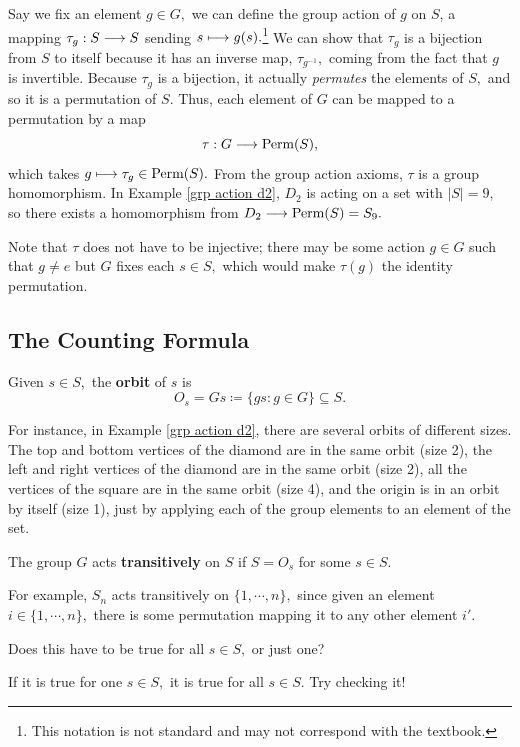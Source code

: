 Say we fix an element $g \in G,$ we can define the group action of $g$ on $S$, a mapping $\tau_g: S \longrightarrow S$ sending $s \longmapsto g(s).$\footnote{This notation is not standard and may not correspond with the textbook.} We can show that $\tau_g$ is a bijection from $S$ to itself because it has an inverse map, $\tau_{g^{-1}},$ coming from the fact that $g$ is invertible. Because $\tau_g$ is a bijection, it actually \emph{permutes} the elements of $S,$ and so it is a permutation of $S.$ Thus, each element of $G$ can be mapped to a permutation by a map
\[
\tau: G \longrightarrow \text{Perm}(S),
\]
which takes $g \longmapsto \tau_g \in \text{Perm}(S).$ From the group action axioms, $\tau$ is a group homomorphism. In Example \ref{grp action d2}, $D_2$ is acting on a set with $|S| = 9,$ so there exists a homomorphism from $D_2 \longrightarrow \text{Perm}(S) = S_9.$

Note that $\tau$ does not have to be injective; there may be some action $g \in G$ such that $g \neq e$ but $G$ fixes each $s \in S,$ which would make $\tau(g)$ the identity permutation.

\subsection{The Counting Formula}

\begin{definition}
Given $s \in S,$ the \textbf{orbit} of $s$ is 
\[
O_s = Gs \coloneqq \{gs : g \in G\} \subseteq S.
\]
\end{definition}

For instance, in Example \ref{grp action d2}, there are several orbits of different sizes. The top and bottom vertices of the diamond are in the same orbit (size 2), the left and right vertices of the diamond are in the same orbit (size 2), all the vertices of the square are in the same orbit (size 4), and the origin is in an orbit by itself (size 1), just by applying each of the group elements to an element of the set.  


\begin{definition}
The group $G$ acts \textbf{transitively} on $S$ if $S = O_s$ for some $s \in S.$ 
\end{definition}

For example, $S_n$ acts transitively on $\{1, \cdots, n\},$ since given an element $i \in \{1, \cdots, n\},$ there is some permutation mapping it to any other element $i'.$

\begin{question}
Does this have to be true for all $s \in S,$ or just one?
\end{question}
\begin{ans}
If it is true for one $s \in S,$ it is true for all $s \in S.$ Try checking it!
\end{ans}


